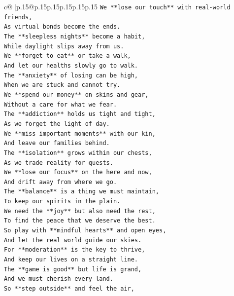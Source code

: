 \documentclass{article}
\begin{document}
{\begin{supertabular}{c@{$\;$}|p{.15\linewidth}@{}p{.15\linewidth}p{.15\linewidth}p{.15\linewidth}p{.15\linewidth}p{.15\linewidth}}
{{{\texttt{We **lose our touch** with real{-}world friends,} \\
\texttt{As virtual bonds become the ends.} \\
\texttt{The **sleepless nights** become a habit,} \\
\texttt{While daylight slips away from us.} \\
\texttt{We **forget to eat** or take a walk,} \\
\texttt{And let our healths slowly go to walk.} \\
\texttt{The **anxiety** of losing can be high,} \\
\texttt{When we are stuck and cannot try.} \\
\texttt{We **spend our money** on skins and gear,} \\
\texttt{Without a care for what we fear.} \\
\texttt{The **addiction** holds us tight and tight,} \\
\texttt{As we forget the light of day.} \\
\texttt{We **miss important moments** with our kin,} \\
\texttt{And leave our families behind.} \\
\texttt{The **isolation** grows within our chests,} \\
\texttt{As we trade reality for quests.} \\
\texttt{We **lose our focus** on the here and now,} \\
\texttt{And drift away from where we go.} \\
\texttt{The **balance** is a thing we must maintain,} \\
\texttt{To keep our spirits in the plain.} \\
\texttt{We need the **joy** but also need the rest,} \\
\texttt{To find the peace that we deserve the best.} \\
\texttt{So play with **mindful hearts** and open eyes,} \\
\texttt{And let the real world guide our skies.} \\
\texttt{For **moderation** is the key to thrive,} \\
\texttt{And keep our lives on a straight line.} \\
\texttt{The **game is good** but life is grand,} \\
\texttt{And we must cherish every land.} \\
\texttt{So **step outside** and feel the air,} \\
}}}
\end{supertabular}}
\end{document}
